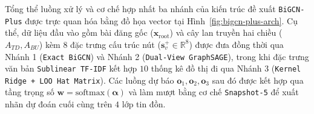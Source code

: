 \documentclass[11pt,a4paper]{extreport}
\begin{document}
Tổng thể luồng xử lý và cơ chế hợp nhất ba nhánh của kiến trúc đề xuất \texttt{BiGCN-Plus} được trực quan hóa bằng đồ họa vector tại Hình~\ref{fig:bigcn-plus-arch}. Cụ thể, dữ liệu đầu vào gồm bài đăng gốc ($\mathbf{x}_{\text{root}}$) và cây lan truyền hai chiều ($A_{TD}, A_{BU}$) kèm $8$ đặc trưng cấu trúc nút ($\mathbf{s}_v^+ \in \mathbb{R}^8$) được đưa đồng thời qua Nhánh 1 (\texttt{Exact BiGCN}) và Nhánh 2 (\texttt{Dual-View GraphSAGE}), trong khi đặc trưng văn bản \texttt{Sublinear TF-IDF} kết hợp $10$ thống kê đồ thị đi qua Nhánh 3 (\texttt{Kernel Ridge + LOO Hat Matrix}). Các luồng dự báo $\mathbf{o}_1, \mathbf{o}_2, \mathbf{o}_3$ sau đó được kết hợp qua tầng trọng số $\mathbf{w} = \text{softmax}(\boldsymbol{\alpha})$ và làm mượt bằng cơ chế \texttt{Snapshot-5} để xuất nhãn dự đoán cuối cùng trên $4$ lớp tin đồn.
\end{document}
